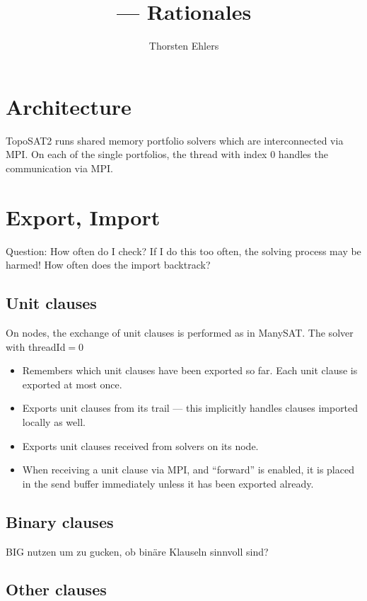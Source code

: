 \documentclass[a4paper,10pt]{article}
\title{\topo --- Rationales}
\author{Thorsten Ehlers}
\newcommand{\topo}{{\sc TopoSAT2}\xspace}
\begin{document}
\maketitle

\section{Architecture}
\topo runs shared memory portfolio solvers which are interconnected via MPI. On each of the single portfolios, the thread with index $0$ handles the communication via MPI. 

\section{Export, Import}
Question: How often do I check? If I do this too often, the solving process may be harmed! How often does the import backtrack? 
\subsection{Unit clauses}
On nodes, the exchange of unit clauses is performed as in ManySAT. The solver with threadId$=0$
\begin{itemize}
 \item Remembers which unit clauses have been exported so far. Each unit clause is exported at most once. 
 \item Exports unit clauses from its trail --- this implicitly handles clauses imported locally as well. 
 \item Exports unit clauses received from solvers on its node. 
 \item When receiving a unit clause via MPI, and ``forward'' is enabled, it is placed in the send buffer immediately unless it has been exported already. 

\end{itemize}



\subsection{Binary clauses}
BIG nutzen um zu gucken, ob binäre Klauseln sinnvoll sind? 
\subsection{Other clauses}
\end{document}
